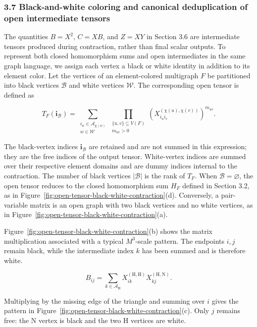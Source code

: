 \subsubsection{3.7 Black-and-white coloring and canonical deduplication of open intermediate tensors}\label{sec:open-intermediate-tensors}

The quantities \(B=X^2\), \(C=XB\), and \(Z=XY\) in Section 3.6 are intermediate tensors produced during contraction, rather than final scalar outputs. To represent both closed homomorphism sums and open intermediates in the same graph language, we assign each vertex a black or white identity in addition to its element color. Let the vertices of an element-colored multigraph \(F\) be partitioned into black vertices \(\mathcal B\) and white vertices \(\mathcal W\). The corresponding open tensor is defined as

\[
T_F(\boldsymbol i_{\mathcal B})
=
\sum_{\substack{i_w\in\mathcal A_{\chi(w)}\\w\in\mathcal W}}
\prod_{\substack{\{u,v\}\subseteq V(F)\\m_{uv}>0}}
\left(X^{(\chi(u),\chi(v))}_{i_ui_v}\right)^{m_{uv}}.
\]

The black-vertex indices \(\boldsymbol i_{\mathcal B}\) are retained and are not summed in this expression; they are the free indices of the output tensor. White-vertex indices are summed over their respective element domains and are dummy indices internal to the contraction. The number of black vertices \(|\mathcal B|\) is the rank of \(T_F\). When \(\mathcal B=\varnothing\), the open tensor reduces to the closed homomorphism sum \(H_F\) defined in Section 3.2, as in Figure~\ref{fig:open-tensor-black-white-contraction}(d). Conversely, a pair-variable matrix is an open graph with two black vertices and no white vertices, as in Figure~\ref{fig:open-tensor-black-white-contraction}(a).

Figure~\ref{fig:open-tensor-black-white-contraction}(b) shows the matrix multiplication associated with a typical \(M^3\)-scale pattern. The endpoints \(i,j\) remain black, while the intermediate index \(k\) has been summed and is therefore white.

\[
B_{ij}
=
\sum_{k\in\mathcal A_{\mathrm H}}
X^{(\mathrm{H,H})}_{ik}X^{(\mathrm{H,N})}_{kj}.
\]

Multiplying by the missing edge of the triangle and summing over \(i\) gives the pattern in Figure~\ref{fig:open-tensor-black-white-contraction}(c). Only \(j\) remains free: the N vertex is black and the two H vertices are white.

